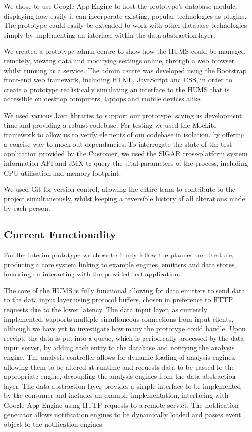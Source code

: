 \documentclass[10pt,a4paper]{article}
\begin{document}
We chose to use Google App Engine to host the prototype's database
module, displaying how easily it can incorporate existing, popular
technologies as plugins. The prototype could easily be extended to
work with other database technologies simply by implementing an
interface within the data abstraction layer.

We created a prototype admin centre to show how the HUMS could be
managed remotely, viewing data and modifying settings online, through
a web browser, whilst running as a service. The admin centre was
developed using the Bootstrap front-end web framework, including 
HTML, JavaScript and CSS, in order to create a prototype realistically
simulating an interface to the HUMS that is accessible on desktop
computers, laptops and mobile devices alike.

We used various Java libraries to support our prototype, saving us 
development time and providing a robust codebase. For testing we used 
the Mockito framework to allow us to verify elements of our codebase in 
isolation, by offering a concise way to mock out dependancies. To 
interrogate the state of the test application provided by the Customer, we 
used the SIGAR cross-platform system information API and JMX to query the 
vital parameters of the process, including CPU utilisation and memory 
footprint.

We used Git for version control, allowing the entire team to
contribute to the project simultaneously, whilst keeping a reversible
history of all alterations made by each person.

\subsection{Current Functionality}
For the interim prototype we chose to firmly follow the planned architecture, producing a core system linking to example engines, emitters and data stores, focussing on interacting with the provided test application.

The core of the HUMS is fully functional allowing for data emitters to send data to the data input layer using protocol buffers, chosen in preference to HTTP requests due to the lower latency. The data input layer, as currently implemented, supports multiple simultaneous connections from input clients, although we have yet to investigate how many the prototype could handle. Upon receipt, the data is put into a queue, which is periodically processed by the data input server, by adding each entry to the database and notifying the analysis engine. The analysis controller allows for dynamic loading of analysis engines, allowing them to be altered at runtime and requests data to be passed to the appropriate engine, decoupling the analysis engines from the data abstraction layer. The data abstraction layer provides a simple interface to be implemented by the consumer and includes an example implementation, interfacing with Google App Engine using HTTP requests to a remote servlet. The notification generator allows notification engines to be dynamically loaded and passes event object to the notification engines.
\end{document}
